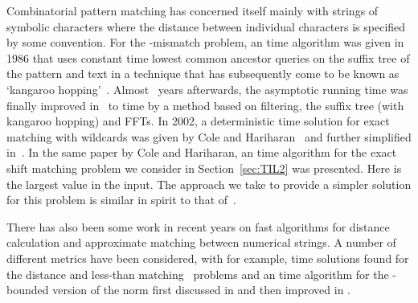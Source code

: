 \documentclass[11pt]{article}
\newcommand{\margin}[1]{}
\theoremstyle{plain}
\theoremstyle{definition}
\begin{document}
\margin{Transposition inv: Add in transposition invariant previous work}

Combinatorial pattern matching has concerned itself mainly with
strings of symbolic characters where the distance between individual
characters is specified by some convention. For the -mismatch problem, an  time algorithm was given in 1986 that uses constant time lowest common ancestor queries on the suffix tree of the pattern and text in a technique that has subsequently come to be known as `kangaroo hopping'~\cite{LV:1986a}. Almost ~years afterwards, the asymptotic running time was finally improved in~\cite{ALP:2004} to  time by a method based on filtering, the suffix tree (with kangaroo hopping) and FFTs.  In 2002, a deterministic  time solution for exact matching with wildcards was given by Cole and Hariharan~\cite{CH:2002} and further simplified in~\cite{Clifford:2007}.  In the same paper by Cole and Hariharan, an  time algorithm for the exact shift matching problem we consider in Section~\ref{sec:TIL2} was presented. Here  is the largest value in the input.  The approach we take to provide a simpler solution for this problem is similar in spirit to that of~\cite{Clifford:2007}.

There has also been some work in recent years on fast algorithms for distance calculation and approximate matching between numerical strings.  A number of different metrics
have been considered, with for example,  time solutions found for the  distance \cite{Atallah:01,CCI:2005,ALPU:2005}
and less-than matching~\cite{Amir:1995} problems and an  time algorithm for the -bounded version of the
 norm first discussed in \cite{CI:2004a} and then improved in \cite{CCI:2005, LP:2005}.
\end{document}

